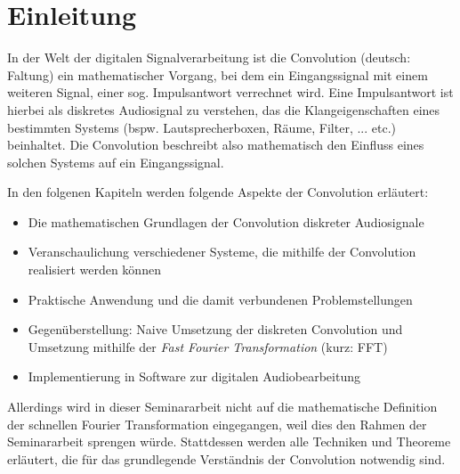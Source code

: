 \chapter{Einleitung}
\label{chapt:intro}

In der Welt der digitalen Signalverarbeitung ist die Convolution (deutsch: \glqq Faltung\grqq) ein mathematischer Vorgang, bei dem 
ein Eingangssignal mit einem weiteren Signal, einer sog. Impulsantwort verrechnet wird.
Eine Impulsantwort ist hierbei als diskretes Audiosignal zu verstehen, das die Klangeigenschaften
eines bestimmten Systems (bspw. Lautsprecherboxen, Räume, Filter, ... etc.) beinhaltet.
Die Convolution beschreibt also mathematisch den Einfluss eines solchen Systems auf ein Eingangssignal.\cite[Kapitel 5]{lyons2011}

In den folgenen Kapiteln werden folgende Aspekte der Convolution erläutert:
\begin{itemize}
    \item Die mathematischen Grundlagen der Convolution diskreter Audiosignale
    \item Veranschaulichung verschiedener Systeme, die mithilfe der Convolution realisiert werden können
    \item Praktische Anwendung und die damit verbundenen Problemstellungen
    \item Gegenüberstellung: Naive Umsetzung der diskreten Convolution und Umsetzung mithilfe der \textit{Fast Fourier Transformation} (kurz: FFT)
    \item Implementierung in Software zur digitalen Audiobearbeitung
\end{itemize}

Allerdings wird in dieser Seminararbeit nicht auf die mathematische Definition der
schnellen Fourier Transformation eingegangen, weil dies den Rahmen der Seminararbeit sprengen würde.
Stattdessen werden alle Techniken und Theoreme erläutert, die für das grundlegende
Verständnis der Convolution notwendig sind.